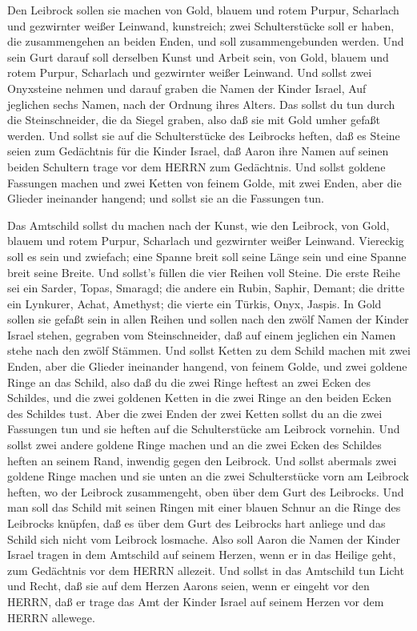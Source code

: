  Den Leibrock sollen sie machen von Gold, blauem und rotem
Purpur, Scharlach und gezwirnter weißer Leinwand, kunstreich;
 zwei Schulterstücke soll er haben, die zusammengehen an
beiden Enden, und soll zusammengebunden werden.  Und sein
Gurt darauf soll derselben Kunst und Arbeit sein, von Gold, blauem und
rotem Purpur, Scharlach und gezwirnter weißer Leinwand.  Und
sollst zwei Onyxsteine nehmen und darauf graben die Namen der Kinder
Israel,  Auf jeglichen sechs Namen, nach der Ordnung ihres
Alters.  Das sollst du tun durch die Steinschneider, die da
Siegel graben, also daß sie mit Gold umher gefaßt werden. 
Und sollst sie auf die Schulterstücke des Leibrocks heften, daß es
Steine seien zum Gedächtnis für die Kinder Israel, daß Aaron ihre Namen
auf seinen beiden Schultern trage vor dem HERRN zum Gedächtnis.
 Und sollst goldene Fassungen machen  und zwei
Ketten von feinem Golde, mit zwei Enden, aber die Glieder ineinander
hangend; und sollst sie an die Fassungen tun.

 Das Amtschild sollst du machen nach der Kunst, wie den
Leibrock, von Gold, blauem und rotem Purpur, Scharlach und gezwirnter
weißer Leinwand.  Viereckig soll es sein und zwiefach; eine
Spanne breit soll seine Länge sein und eine Spanne breit seine Breite.
 Und sollst's füllen die vier Reihen voll Steine. Die erste
Reihe sei ein Sarder, Topas, Smaragd;  die andere ein
Rubin, Saphir, Demant;  die dritte ein Lynkurer, Achat,
Amethyst;  die vierte ein Türkis, Onyx, Jaspis. In Gold
sollen sie gefaßt sein in allen Reihen  und sollen nach den
zwölf Namen der Kinder Israel stehen, gegraben vom Steinschneider, daß
auf einem jeglichen ein Namen stehe nach den zwölf Stämmen.
 Und sollst Ketten zu dem Schild machen mit zwei Enden,
aber die Glieder ineinander hangend, von feinem Golde,  und
zwei goldene Ringe an das Schild, also daß du die zwei Ringe heftest an
zwei Ecken des Schildes,  und die zwei goldenen Ketten in
die zwei Ringe an den beiden Ecken des Schildes tust.  Aber
die zwei Enden der zwei Ketten sollst du an die zwei Fassungen tun und
sie heften auf die Schulterstücke am Leibrock vornehin. 
Und sollst zwei andere goldene Ringe machen und an die zwei Ecken des
Schildes heften an seinem Rand, inwendig gegen den Leibrock.
 Und sollst abermals zwei goldene Ringe machen und sie
unten an die zwei Schulterstücke vorn am Leibrock heften, wo der
Leibrock zusammengeht, oben über dem Gurt des Leibrocks. 
Und man soll das Schild mit seinen Ringen mit einer blauen Schnur an die
Ringe des Leibrocks knüpfen, daß es über dem Gurt des Leibrocks hart
anliege und das Schild sich nicht vom Leibrock losmache. 
Also soll Aaron die Namen der Kinder Israel tragen in dem Amtschild auf
seinem Herzen, wenn er in das Heilige geht, zum Gedächtnis vor dem HERRN
allezeit.  Und sollst in das Amtschild tun Licht und Recht,
daß sie auf dem Herzen Aarons seien, wenn er eingeht vor den HERRN, daß
er trage das Amt der Kinder Israel auf seinem Herzen vor dem HERRN
allewege.


